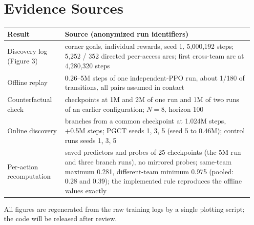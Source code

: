 \documentclass[10pt]{article}
\begin{document}
\section{Evidence Sources}
\begin{table}[h]\centering\small
\begin{tabular}{p{.33\linewidth}p{.6\linewidth}}\toprule
Result & Source (anonymized run identifiers)\\\midrule
Discovery log (Figure 3) & corner goals, individual rewards, seed 1, 5{,}000{,}192 steps; 5{,}252 / 352 directed peer-access arcs; first cross-team arc at 4{,}280{,}320 steps\\
Offline replay & 0.26--5M steps of one independent-PPO run, about 1/180 of transitions, all pairs assumed in contact\\
Counterfactual check & checkpoints at 1M and 2M of one run and 1M of two runs of an earlier configuration; $N=8$, horizon 100\\
Online discovery & branches from a common checkpoint at 1.024M steps, +0.5M steps; PGCT seeds 1, 3, 5 (seed 5 to 0.46M); control runs seeds 1, 3, 5\\
Per-action recomputation & saved predictors and probes of 25 checkpoints (the 5M run and three branch runs), no mirrored probes; same-team maximum 0.281, different-team minimum 0.975 (pooled: 0.28 and 0.39); the implemented rule reproduces the offline values exactly\\\bottomrule
\end{tabular}
\end{table}

All figures are regenerated from the raw training logs by a single plotting script; the code will be released after review.
\end{document}
